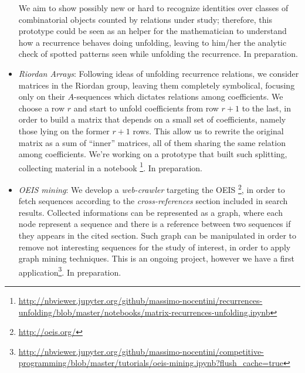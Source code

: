 \documentclass[a4paper]{tufte-handout}
\begin{document}
\begin{itemize}
            We aim to show possibly new or hard to recognize identities over classes of combinatorial objects counted by
            relations under study; therefore, this prototype could be seen as an helper for the mathematician to understand
            how a recurrence behaves doing unfolding, leaving to him/her the analytic check of spotted patterns seen 
            while unfolding the recurrence. In preparation.

        \item \emph{Riordan Arrays}: Following ideas of unfolding recurrence relations, we consider matrices in the Riordan group,
            leaving them completely symbolical, focusing only on their $A$-sequences which dictates relations among coefficients.
            We choose a row $r$ and start to unfold coefficients from row $r+1$ to the last, in order to build a matrix that 
            depends on a small set of coefficients, namely those lying on the former $r+1$ rows. This allow us to rewrite
            the original matrix as a sum of ``inner'' matrices, all of them sharing the same relation among coefficients.
            We're working on a prototype that built such splitting, collecting material in a notebook
            \footnote{\url{http://nbviewer.jupyter.org/github/massimo-nocentini/recurrences-unfolding/blob/master/notebooks/matrix-recurrences-unfolding.ipynb}}.
            In preparation.

        \item\emph{OEIS mining}: We develop a \emph{web-crawler} targeting the OEIS \footnote{\url{http://oeis.org/}}, in order
            to fetch sequences according to the \emph{cross-references} section included in search results. Collected 
            informations can be represented as a graph, where each node represent a sequence and there is a reference
            between two sequences if they appears in the cited section. Such graph can be manipulated in order to remove
            not interesting sequences for the study of interest, in order to apply graph mining techniques. This is an
            ongoing project, however we have a first application\footnote{\url{http://nbviewer.jupyter.org/github/massimo-nocentini/competitive-programming/blob/master/tutorials/oeis-mining.ipynb?flush_cache=true}}. In preparation.


\end{itemize}
\end{document}
